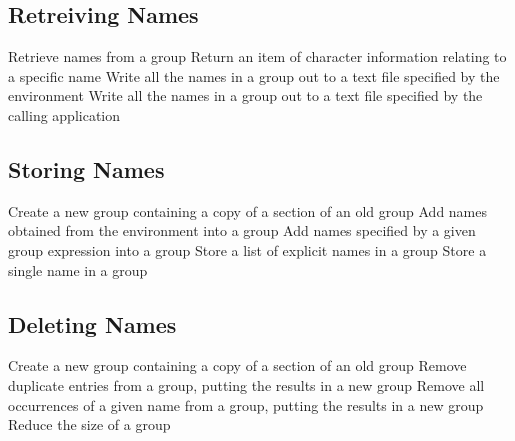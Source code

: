\subsection{Retreiving Names}

            {Retrieve names from a group}
            {Return an item of character information relating to a specific name}
            {Write all the names in a group out to a text file specified by the
environment}
            {Write all the names in a group out to a text file specified by the
calling application}


\subsection{Storing Names}

            {Create a new group containing a copy of a section of an old group}
            {Add names obtained from the environment into a group}
            {Add names specified by a given group expression into a group}
            {Store a list of explicit names in a group}
            {Store a single name in a group}



\subsection{Deleting Names}

            {Create a new group containing a copy of a section of an old group}
            {Remove duplicate entries from a group, putting the results in a new
group}
            {Remove all occurrences of a given name from a group, putting the results in a new group}
            {Reduce the size of a group}


